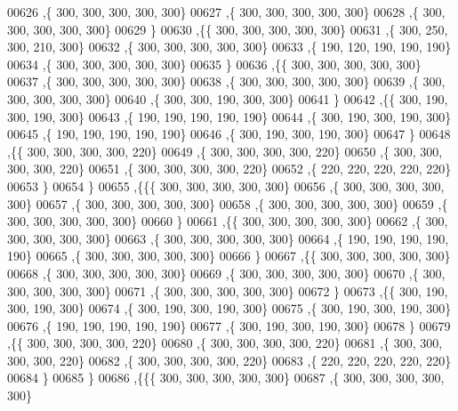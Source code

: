 \begin{DoxyCode}
00626    ,\{   300,   300,   300,   300,   300\}
00627    ,\{   300,   300,   300,   300,   300\}
00628    ,\{   300,   300,   300,   300,   300\}
00629    \}
00630   ,\{\{   300,   300,   300,   300,   300\}
00631    ,\{   300,   250,   300,   210,   300\}
00632    ,\{   300,   300,   300,   300,   300\}
00633    ,\{   190,   120,   190,   190,   190\}
00634    ,\{   300,   300,   300,   300,   300\}
00635    \}
00636   ,\{\{   300,   300,   300,   300,   300\}
00637    ,\{   300,   300,   300,   300,   300\}
00638    ,\{   300,   300,   300,   300,   300\}
00639    ,\{   300,   300,   300,   300,   300\}
00640    ,\{   300,   300,   190,   300,   300\}
00641    \}
00642   ,\{\{   300,   190,   300,   190,   300\}
00643    ,\{   190,   190,   190,   190,   190\}
00644    ,\{   300,   190,   300,   190,   300\}
00645    ,\{   190,   190,   190,   190,   190\}
00646    ,\{   300,   190,   300,   190,   300\}
00647    \}
00648   ,\{\{   300,   300,   300,   300,   220\}
00649    ,\{   300,   300,   300,   300,   220\}
00650    ,\{   300,   300,   300,   300,   220\}
00651    ,\{   300,   300,   300,   300,   220\}
00652    ,\{   220,   220,   220,   220,   220\}
00653    \}
00654   \}
00655  ,\{\{\{   300,   300,   300,   300,   300\}
00656    ,\{   300,   300,   300,   300,   300\}
00657    ,\{   300,   300,   300,   300,   300\}
00658    ,\{   300,   300,   300,   300,   300\}
00659    ,\{   300,   300,   300,   300,   300\}
00660    \}
00661   ,\{\{   300,   300,   300,   300,   300\}
00662    ,\{   300,   300,   300,   300,   300\}
00663    ,\{   300,   300,   300,   300,   300\}
00664    ,\{   190,   190,   190,   190,   190\}
00665    ,\{   300,   300,   300,   300,   300\}
00666    \}
00667   ,\{\{   300,   300,   300,   300,   300\}
00668    ,\{   300,   300,   300,   300,   300\}
00669    ,\{   300,   300,   300,   300,   300\}
00670    ,\{   300,   300,   300,   300,   300\}
00671    ,\{   300,   300,   300,   300,   300\}
00672    \}
00673   ,\{\{   300,   190,   300,   190,   300\}
00674    ,\{   300,   190,   300,   190,   300\}
00675    ,\{   300,   190,   300,   190,   300\}
00676    ,\{   190,   190,   190,   190,   190\}
00677    ,\{   300,   190,   300,   190,   300\}
00678    \}
00679   ,\{\{   300,   300,   300,   300,   220\}
00680    ,\{   300,   300,   300,   300,   220\}
00681    ,\{   300,   300,   300,   300,   220\}
00682    ,\{   300,   300,   300,   300,   220\}
00683    ,\{   220,   220,   220,   220,   220\}
00684    \}
00685   \}
00686  ,\{\{\{   300,   300,   300,   300,   300\}
00687    ,\{   300,   300,   300,   300,   300\}

\end{DoxyCode}
